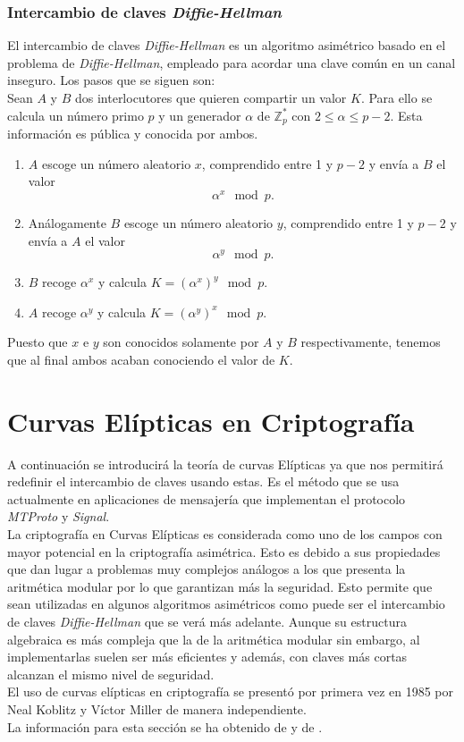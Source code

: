\subsubsection{Intercambio de claves \emph{Diffie-Hellman}}
El intercambio de claves \emph{Diffie-Hellman} es un algoritmo asimétrico basado en el problema de \emph{Diffie-Hellman}, empleado para acordar una clave común en un canal inseguro. Los pasos que se siguen son:\\
Sean $A$ y $B$ dos interlocutores que quieren compartir un valor $K$. Para ello se calcula un número primo $p$ y un generador $\alpha$ de $\mathbb{Z}^*_{p}$ con $2\leq \alpha \leq p-2$. Esta información es pública y conocida por ambos.
\begin{enumerate}
	\item $A$ escoge un número aleatorio $x$, comprendido entre 1 y $p-2$ y envía a $B$ el valor 
		$$
			\alpha^x \mod p.
		$$
	\item Análogamente $B$ escoge un número aleatorio $y$, comprendido entre 1 y $p-2$ y envía a $A$ el valor 
		$$
			\alpha^y \mod p.
		$$

	\item $B$ recoge $\alpha^x$ y calcula $K=(\alpha^x)^y \mod p$.
	\item $A$ recoge $\alpha^y$ y calcula $K=(\alpha^y)^x \mod p$.
\end{enumerate}
Puesto que $x$ e $y$ son conocidos solamente por $A$ y $B$ respectivamente, tenemos que al final ambos acaban conociendo el valor de $K$.\\

\section{Curvas Elípticas en Criptografía}
A continuación se introducirá la teoría de curvas Elípticas ya que nos permitirá redefinir el intercambio de claves usando estas. Es el método que se usa actualmente en aplicaciones de mensajería que implementan el protocolo \emph{MTProto} y \emph{Signal}.\\
La criptografía en Curvas Elípticas es considerada como uno de los campos con mayor potencial en la criptografía asimétrica.
Esto es debido a sus propiedades que dan lugar a problemas muy complejos análogos a los que presenta la aritmética modular por lo que garantizan más la seguridad. 
Esto permite que sean utilizadas en algunos algoritmos asimétricos como puede ser el intercambio de claves \emph{Diffie-Hellman} que se verá más adelante. 
Aunque su estructura algebraica es más compleja que la de la aritmética modular sin embargo, al implementarlas suelen ser más eficientes y además, con claves más cortas alcanzan 
el mismo nivel de seguridad.\\
El uso de curvas elípticas en criptografía se presentó por primera vez en 1985 por Neal Koblitz y Víctor Miller de manera independiente.\\
La información para esta sección se ha obtenido de \cite{En2011} y de \cite{apuntesCriptografia}.\\

